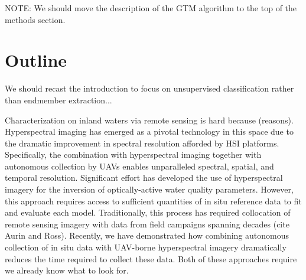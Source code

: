 \documentclass{article}
\begin{document}
NOTE: We should move the description of the GTM algorithm to the top of the methods section.

\section*{Outline}
We should recast the introduction to focus on unsupervised classification rather than endmember extraction... 

Characterization on inland waters via remote sensing is hard because (reasons). Hyperspectral imaging has emerged as a pivotal technology in this space due to the dramatic improvement in spectral resolution afforded by HSI platforms. Specifically, the combination with hyperspectral imaging together with autonomous collection by UAVs enables unparalleled spectral, spatial, and temporal resolution. Significant effort has developed the use of hyperspectral imagery for the inversion of optically-active water quality parameters. However, this approach requires access to sufficient quantities of in situ reference data to fit and evaluate each model. Traditionally, this process has required collocation of remote sensing imagery with data from field campaigns spanning decades (cite Aurin and Ross). Recently, we have demonstrated how combining autonomous collection of in situ data with UAV-borne hyperspectral imagery dramatically reduces the time required to collect these data. Both of these approaches require we already know what to look for. 
\end{document}
